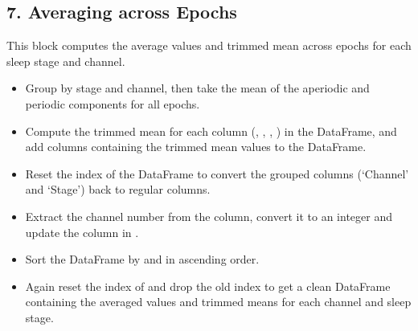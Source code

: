 \documentclass[letterpaper,10pt,english]{sphinxmanual}
\begin{document}
\subsection{7. Averaging across Epochs}
\label{\detokenize{code:averaging-across-epochs}}
\sphinxAtStartPar
This block computes the average values and trimmed mean across epochs for each sleep stage and channel.
\begin{itemize}
\item {} 
\sphinxAtStartPar
Group by stage and channel, then take the mean of the aperiodic and periodic components for all epochs.

\item {} 
\sphinxAtStartPar
Compute the trimmed mean for each column (, , , ) in the  DataFrame, and add columns containing the trimmed mean values to the  DataFrame.

\item {} 
\sphinxAtStartPar
Reset the index of the  DataFrame to convert the grouped columns (‘Channel’ and ‘Stage’) back to regular columns.

\item {} 
\sphinxAtStartPar
Extract the channel number from the  column, convert it to an integer and update the  column in .

\item {} 
\sphinxAtStartPar
Sort the DataFrame by  and  in ascending order.

\item {} 
\sphinxAtStartPar
Again reset the index of  and drop the old index to get a clean DataFrame containing the averaged values and trimmed means for each channel and sleep stage.

\end{itemize}
\end{document}
